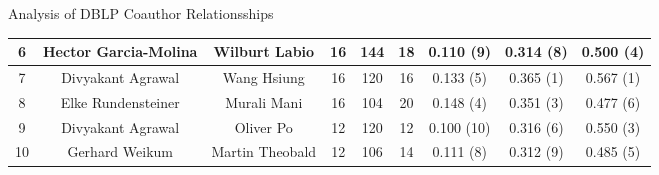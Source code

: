 \begin{frame}{Analysis of DBLP Coauthor Relationsships}
{\begin{tabular}{|c|c|c|c|c|c||c|c|c|}
			6                         & Hector Garcia-Molina          & Wilburt Labio        & 16               & 144 & 18
			                          &
			0.110 (9)                 & 0.314 (8)                     & 0.500 (4)                                                  \\\hline
			\color{red}7              & \color{red}Divyakant Agrawal  &
			\color{red}Wang Hsiung    & \color{red}16                 & \color{red}120       &
			\color{red}16             & \color{red}0.133 (5)          & \color{red}0.365 (1)
			                          & \color{red}0.567 (1)                                                                       \\\hline
			8                         & Elke Rundensteiner            & Murali Mani          & 16               & 104 & 20
			                          &
			0.148 (4)                 & 0.351 (3)                     & 0.477 (6)                                                  \\\hline
			\color{red}9              & \color{red}Divyakant Agrawal  &
			\color{red}Oliver Po      & \color{red}12                 & \color{red}120       &
			\color{red}12             & \color{red}0.100 (10)         & \color{red}0.316
			(6)                       & \color{red}0.550 (3)                                                                       \\\hline
			10                        & Gerhard Weikum                & Martin Theobald      & 12               & 106 & 14
			                          &
			0.111 (8)                 & 0.312 (9)                     & 0.485 (5)                                                  \\\hline
		\end{tabular}}
\end{frame}

